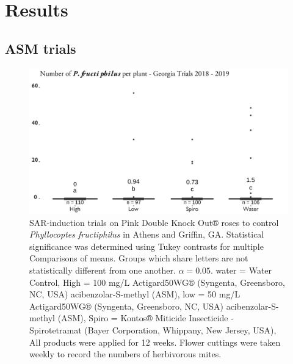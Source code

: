 \documentclass{ufdissertation}[overrideChapters] %
\begin{document}
{\hypertarget{results-2}{%
\section{Results}\label{results-2}}

\hypertarget{asm-trials}{%
\subsection{ASM trials}\label{asm-trials}}
\begin{figure}

{\centering \includegraphics[width=1\linewidth]{figure/rrv_actigard_graph} 

}

\caption[SAR-induction trials on Pink Double Knock Out® roses to control \textit{Phyllocoptes fructiphilus} in Athens and Griffin, GA]{SAR-induction trials on Pink Double Knock Out® roses to control \textit{Phyllocoptes fructiphilus} in Athens and Griffin, GA. Statistical significance was determined using Tukey contrasts for multiple Comparisons of means. Groups which share letters are not statistically different from one another. $\alpha = 0.05$. water = Water Control, High = 100 \si{\milli\gram}/\si{\liter} Actigard50WG® (Syngenta, Greensboro, NC, USA) acibenzolar-S-methyl (ASM), low = 50 \si{\milli\gram}/\si{\liter} Actigard50WG® (Syngenta, Greensboro, NC, USA) acibenzolar-S-methyl (ASM), Spiro = Kontos® Miticide Insecticide - Spirotetramat (Bayer Corporation, Whippany, New Jersey, USA), All products were applied for 12 weeks. Flower cuttings were taken weekly to record the numbers of herbivorous mites.}\label{fig:asm-graph}
\end{figure}
\begin{landscape}\begin{table}


\end{table}
\end{landscape}}
\end{document}

